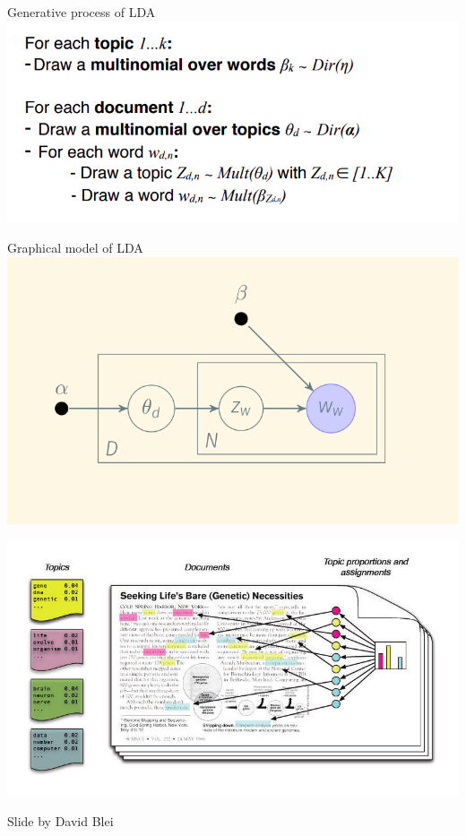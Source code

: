 \documentclass[svgnames]{beamer}
\begin{document}
    \begin{frame}{Generative process of LDA}
        \includegraphics[width=\textwidth]{words-gener-lda}
    \end{frame}

    \begin{frame}{Graphical model of LDA}
        \includegraphics[width=\textwidth]{lda-graph}
    \end{frame}

    \begin{frame}[plain]
        \includegraphics[width=\textwidth]{blei-slide}
        \footnotesize

        Slide by David Blei
    \end{frame}
\end{document}
